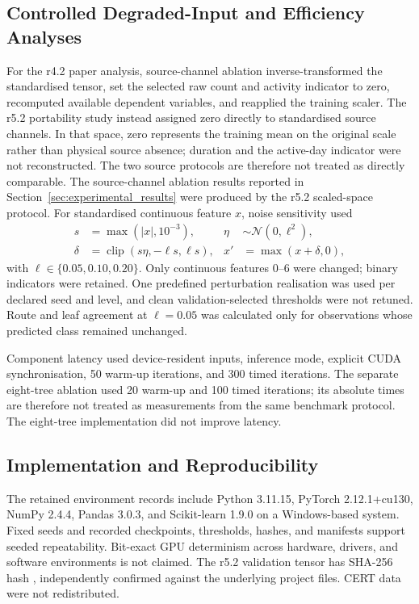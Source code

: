 \subsection{Controlled Degraded-Input and Efficiency Analyses}
\label{subsec:degraded_input_method}
For the r4.2 paper analysis, source-channel ablation inverse-transformed the
standardised tensor, set the selected raw count and activity indicator to
zero, recomputed available dependent variables, and reapplied the training
scaler. The r5.2 portability study instead assigned zero directly to
standardised source channels. In that space, zero represents the training
mean on the original scale rather than physical source absence; duration
and the active-day indicator were not reconstructed. The two source
protocols are therefore not treated as directly comparable. The
source-channel ablation results reported in
Section~\ref{sec:experimental_results} were produced by the r5.2
scaled-space protocol.
For standardised continuous feature \(x\), noise sensitivity used
\begin{equation}
\begin{aligned}
s&=\max(|x|,10^{-3}), &
\eta&\sim\mathcal N(0,\ell^{2}),\\
\delta&=\operatorname{clip}(s\eta,-\ell s,\ell s), &
x'&=\max(x+\delta,0),
\end{aligned}
\end{equation}
with \(\ell\in\{0.05,0.10,0.20\}\). Only continuous features 0--6 were
changed; binary indicators were retained. One predefined perturbation
realisation was used per declared seed and level, and clean
validation-selected thresholds were not retuned. Route and leaf agreement
at \(\ell=0.05\) was calculated only for observations whose predicted class
remained unchanged.

\smallskip
Component latency used device-resident inputs, inference mode, explicit
CUDA synchronisation, 50 warm-up iterations, and 300 timed iterations.
The separate eight-tree ablation used 20 warm-up and 100 timed iterations;
its absolute times are therefore not treated as measurements from the same
benchmark protocol. The eight-tree implementation did not improve latency.

\subsection{Implementation and Reproducibility}
\label{subsec:implementation_environment}
The retained environment records include Python 3.11.15, PyTorch
2.12.1+cu130, NumPy 2.4.4, Pandas 3.0.3, and Scikit-learn 1.9.0 on a
Windows-based system. Fixed seeds and recorded checkpoints, thresholds,
hashes, and manifests support seeded repeatability. Bit-exact GPU
determinism across hardware, drivers, and software environments is not
claimed. The r5.2 validation tensor has SHA-256 hash
\texttt{},
independently confirmed against the underlying project files. CERT data
were not redistributed.